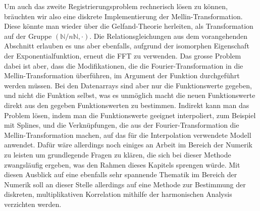 Um auch das zweite Registrierungsproblem rechnerisch lösen zu können, 
bräuchten wir also eine diskrete Implementierung der Mellin-Transformation.
Diese könnte man wieder über die Gelfand-Theorie herleiten, als 
Transformation auf der Gruppe $(\mathbb{N}/n\mathbb{N},\cdot)$.
Die Relationsgleichungen aus dem vorangehenden Abschnitt erlauben es uns 
aber ebenfalls, aufgrund der isomorphen Eigenschaft der 
Exponentialfunktion, erneut die FFT zu verwenden.
Das grosse Problem dabei ist aber, dass die Modifikationen, die die 
Fourier-Trans\-for\-ma\-tion in die Mellin-Transformation überführen, 
im Argument der Funktion durchgeführt werden müssen.
Bei den Datenarrays sind aber nur die Funktionswerte gegeben, und nicht 
die Funktion selbst, was es unmöglich macht die neuen Funktionswerte 
direkt aus den gegeben Funktionswerten zu bestimmen.
Indirekt kann man das Problem lösen, indem man die Funktionswerte 
geeignet interpoliert, zum Beispiel mit Splines, und die Verknüpfungen, 
die aus der Fourier-Transformation die Mellin-Transformation machen, 
auf das für die Interpolation verwendete Modell anwendet.
Dafür wäre allerdings noch einiges an Arbeit im Bereich der Numerik zu 
leisten um grundlegende Fragen zu klären, die sich bei dieser Methode 
zwangsläufig ergeben, was den Rahmen dieses Kapitels sprengen würde.
Mit diesen Ausblick auf eine ebenfalls sehr spannende Thematik im 
Bereich der Numerik soll an dieser Stelle allerdings auf eine Methode 
zur Bestimmung der diskreten, multiplikativen Korrelation mithilfe der 
harmonischen Analysis verzichten werden.






